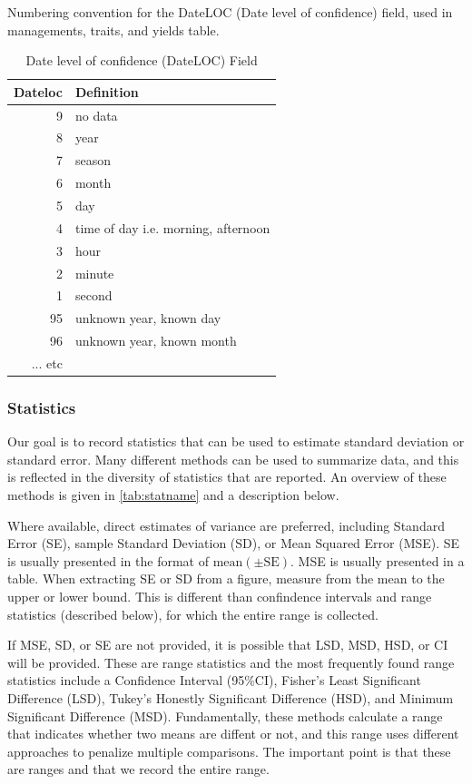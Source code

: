 \documentclass[12pt,english,portrait]{article}
\begin{document}
\begin{table}
  \caption{Date level of confidence (DateLOC) Field}{Numbering convention for the DateLOC (Date level of confidence) field, used in managements, traits, and yields table. }
  \label{tab:dateloc}
  \begin{tabular}{rl}
    \hline
    Dateloc &  Definition\\
    \hline 
    9 & no data \\
    8 & year \\
    7 & season \\
    6 & month \\
    5 & day \\
    4 & time of day i.e. morning, afternoon \\
    3 & hour \\
    2 & minute \\
    1 & second \\
    95 & unknown year, known day \\
    96 & unknown year, known month \\
    ... etc& \\ \hline
  \end{tabular}
\end{table}

\subsubsection{Statistics}\label{sec:stats}

Our goal is to record statistics that can be used to estimate standard deviation or standard error.
Many different methods can be used to summarize data, and this is reflected in the diversity of statistics that are reported. 
 An overview of these methods is given in \autoref{tab:statname} and a description below.

 Where available, direct estimates of variance are preferred, including Standard Error (SE), sample Standard Deviation (SD), or Mean Squared Error (MSE).
 SE is usually presented in the format of $\text{mean} (\pm \text{SE})$.
 MSE is usually presented in a table.
 When extracting SE or SD from a figure, measure from the mean to the upper or lower bound.
 This is different than confindence intervals and range statistics (described below), for which the entire range is collected. 
  
 If MSE, SD, or SE are not provided, it is possible that LSD, MSD, HSD, or CI will be provided. 
 These are range statistics and the most frequently found range statistics include a Confidence Interval (95\%CI), Fisher's Least Significant Difference (LSD), Tukey's Honestly Significant Difference (HSD), and Minimum Significant Difference (MSD).
 Fundamentally, these methods calculate a range that indicates whether two means are diffent or not, and this range uses different approaches to penalize multiple comparisons.
 The important point is that these are ranges and that we record the entire range.
\end{document}
